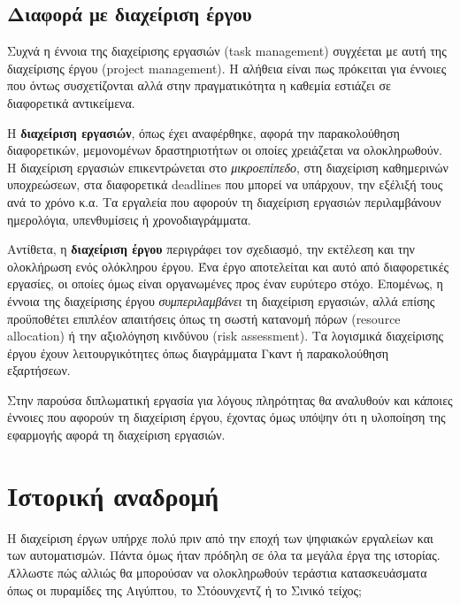         \subsection{Διαφορά με διαχείριση έργου}
            Συχνά η έννοια της διαχείρισης εργασιών (task management) συγχέεται με αυτή της διαχείρισης έργου (project management). Η αλήθεια είναι πως πρόκειται για έννοιες που όντως συσχετίζονται αλλά στην πραγματικότητα η καθεμία εστιάζει σε διαφορετικά αντικείμενα.

            Η \textbf{διαχείριση εργασιών}, όπως έχει αναφέρθηκε, αφορά την παρακολούθηση διαφορετικών, μεμονομένων δραστηριοτήτων οι οποίες χρειάζεται να ολοκληρωθούν. Η διαχείριση εργασιών επικεντρώνεται στο \textit{μικροεπίπεδο}, στη διαχείριση καθημερινών υποχρεώσεων, στα διαφορετικά deadlines που μπορεί να υπάρχουν, την εξέλιξή τους ανά το χρόνο κ.α. Τα εργαλεία που αφορούν τη διαχείριση εργασιών περιλαμβάνουν ημερολόγια, υπενθυμίσεις ή χρονοδιαγράμματα.

            Αντίθετα, η \textbf{διαχείριση έργου} περιγράφει τον σχεδιασμό, την εκτέλεση και την ολοκλήρωση ενός ολόκληρου έργου. Ένα έργο αποτελείται και αυτό από διαφορετικές εργασίες, οι οποίες όμως είναι οργανωμένες προς έναν ευρύτερο στόχο. Επομένως, η έννοια της διαχείρισης έργου \textit{συμπεριλαμβάνει} τη διαχείριση εργασιών, αλλά επίσης προϋποθέτει επιπλέον απαιτήσεις όπως τη σωστή κατανομή πόρων (resource allocation) ή την αξιολόγηση κινδύνου (risk assessment). Τα λογισμικά διαχείρισης έργου έχουν λειτουργικότητες όπως διαγράμματα Γκαντ ή παρακολούθηση εξαρτήσεων.

            Στην παρούσα διπλωματική εργασία για λόγους πληρότητας θα αναλυθούν και κάποιες έννοιες που αφορούν τη διαχείριση έργου, έχοντας όμως υπόψην ότι η υλοποίηση της εφαρμογής αφορά τη διαχείριση εργασιών.


    \section{Ιστορική αναδρομή}
        Η διαχείριση έργων υπήρχε πολύ πριν από την εποχή των ψηφιακών εργαλείων και των αυτοματισμών. Πάντα όμως ήταν πρόδηλη σε όλα τα μεγάλα έργα της ιστορίας. Άλλωστε πώς αλλιώς θα μπορούσαν να ολοκληρωθούν τεράστια κατασκευάσματα όπως οι πυραμίδες της Αιγύπτου, το Στόουνχεντζ ή το Σινικό τείχος;

